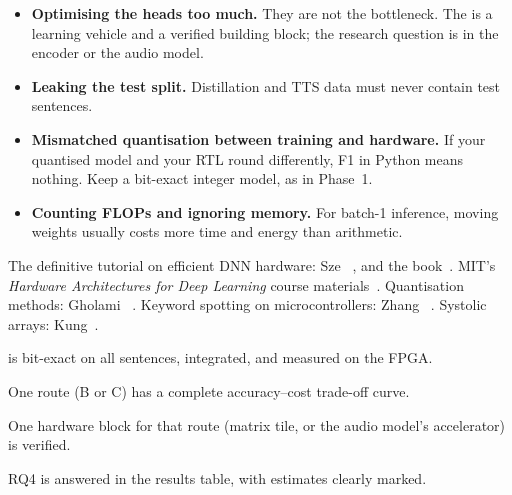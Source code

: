 \begin{pitfallbox}
\begin{itemize}
  \item \textbf{Optimising the heads too much.} They are not the bottleneck. The
         is a learning vehicle and a verified building block;
        the research question is in the encoder or the audio model.
  \item \textbf{Leaking the test split.} Distillation and TTS data must never
        contain test sentences.
  \item \textbf{Mismatched quantisation between training and hardware.} If your
        quantised model and your RTL round differently, F1 in Python means
        nothing. Keep a bit-exact integer model, as in Phase~1.
  \item \textbf{Counting FLOPs and ignoring memory.} For batch-1 inference,
        moving weights usually costs more time and energy than arithmetic.
\end{itemize}
\end{pitfallbox}

\begin{readbox}
The definitive tutorial on efficient DNN hardware: Sze \etal~\cite{sze2017efficient},
and the book~\cite{sze2020book}. MIT's \emph{Hardware Architectures for Deep
Learning} course materials~\cite{ch12-13:mit65930}. Quantisation methods:
Gholami \etal~\cite{ch12-13:gholami2021quant}. Keyword spotting on
microcontrollers: Zhang \etal~\cite{zhang2017helloedge}. Systolic arrays:
Kung~\cite{kung1982systolic}.
\end{readbox}

\begin{donebox}
\begin{checklist}
  \item {} is bit-exact on all sentences, integrated, and measured on the FPGA.
  \item One route (B or C) has a complete accuracy--cost trade-off curve.
  \item One hardware block for that route (matrix tile, or the audio model's accelerator) is verified.
  \item RQ4 is answered in the results table, with estimates clearly marked.
\end{checklist}
\end{donebox}
